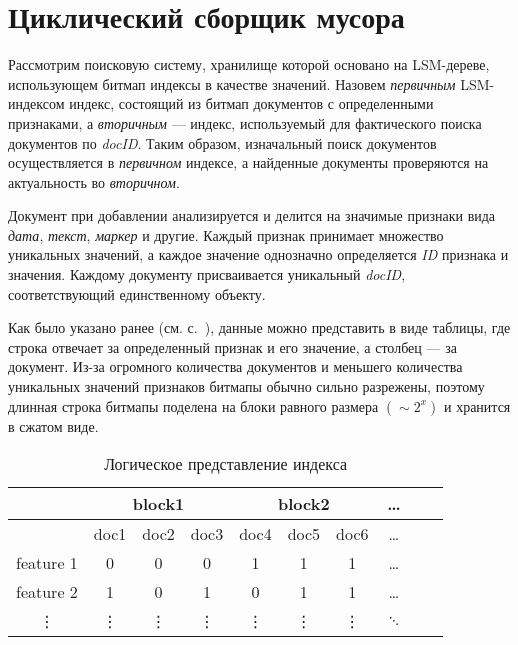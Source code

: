 \newpage
\section{Циклический сборщик мусора}

Рассмотрим поисковую систему, хранилище которой основано на LSM-дереве,
использующем битмап индексы в качестве значений. Назовем \textit{первичным}
LSM-индексом индекс, состоящий из битмап документов с определенными признаками,
а \textit{вторичным} — индекс, используемый для фактического поиска документов
по \textit{docID}. Таким образом, изначальный поиск документов осуществляется в
\textit{первичном} индексе, а найденные документы проверяются на актуальность
во \textit{вторичном}.

Документ при добавлении анализируется и делится на значимые признаки вида
\textit{дата}, \textit{текст}, \textit{маркер} и другие. Каждый признак
принимает множество уникальных значений, а каждое значение однозначно определяется
\textit{ID} признака и значения. Каждому документу присваивается уникальный
\textit{docID}, соответствующий единственному объекту.

Как было указано ранее (см. с.~\pageref{table}), данные можно представить в виде
таблицы, где строка отвечает за определенный признак и его значение, а столбец
— за документ. Из-за огромного количества документов и меньшего количества
уникальных значений признаков битмапы обычно сильно разрежены, поэтому длинная
строка битмапы поделена на блоки равного размера $(\sim 2^{x})$ и хранится в
сжатом виде.

\begin{table}[H]
\caption{Логическое представление индекса}
\centering
\small
\singlespacing
\begin{tabular}{|c|c|c|c|c|c|c|c|c|c|}
    \hline
                &\multicolumn{3}{c|}{block1}&\multicolumn{3}{c|}{block2}& \ldots \\ \hline
                & doc1  & doc2  & doc3      & doc4  & doc5      & doc6  & \ldots \\ \hline
    feature 1   & 0     & 0     & 0         & 1     & 1         & 1     & \ldots \\ \hline
    feature 2   & 1     & 0     & 1         & 0     & 1         & 1     & \ldots \\ \hline
    \vdots      & \vdots& \vdots& \vdots    & \vdots& \vdots    &\vdots & $\ddots$ \\ \hline
\end{tabular}
\label{index}
\end{table}

